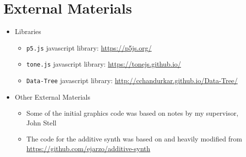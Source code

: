 \chapter{External Materials}
\begin{itemize}
    \item Libraries
    \begin{itemize}
        \item \verb|p5.js| javascript library: \url{https://p5js.org/}
        \item \verb|tone.js| javascript library: \url{https://tonejs.github.io/}
        \item \verb|Data-Tree| javascript library:
            \url{http://cchandurkar.github.io/Data-Tree/}
    \end{itemize}
    \item Other External Materials
    \begin{itemize}
        \item Some of the initial graphics code was based on notes by my
            supervisor, John Stell
        \item The code for the additive synth was based on and heavily modified
            from \url{https://github.com/ejarzo/additive-synth}
    \end{itemize}
\end{itemize}


